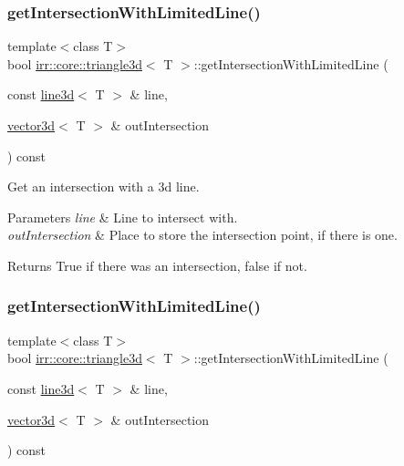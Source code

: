 \subsubsection{\texorpdfstring{get\+Intersection\+With\+Limited\+Line()}{getIntersectionWithLimitedLine()}\hspace{0.1cm}{\footnotesize\ttfamily [1/2]}}
{\footnotesize\ttfamily template$<$class T$>$ \\
bool \hyperlink{classirr_1_1core_1_1triangle3d}{irr\+::core\+::triangle3d}$<$ T $>$\+::get\+Intersection\+With\+Limited\+Line (\begin{DoxyParamCaption}\item[{const \hyperlink{classirr_1_1core_1_1line3d}{line3d}$<$ T $>$ \&}]{line,  }\item[{\hyperlink{classirr_1_1core_1_1vector3d}{vector3d}$<$ T $>$ \&}]{out\+Intersection }\end{DoxyParamCaption}) const\hspace{0.3cm}{\ttfamily [inline]}}



Get an intersection with a 3d line. 


\begin{DoxyParams}{Parameters}
{\em line} & Line to intersect with. \\
\hline
{\em out\+Intersection} & Place to store the intersection point, if there is one. \\
\hline
\end{DoxyParams}
\begin{DoxyReturn}{Returns}
True if there was an intersection, false if not. 
\end{DoxyReturn}
\mbox{\label{classirr_1_1core_1_1triangle3d_a3274d1e1ee1d28050176736c5e6773c2}} 
\subsubsection{\texorpdfstring{get\+Intersection\+With\+Limited\+Line()}{getIntersectionWithLimitedLine()}\hspace{0.1cm}{\footnotesize\ttfamily [2/2]}}
{\footnotesize\ttfamily template$<$class T$>$ \\
bool \hyperlink{classirr_1_1core_1_1triangle3d}{irr\+::core\+::triangle3d}$<$ T $>$\+::get\+Intersection\+With\+Limited\+Line (\begin{DoxyParamCaption}\item[{const \hyperlink{classirr_1_1core_1_1line3d}{line3d}$<$ T $>$ \&}]{line,  }\item[{\hyperlink{classirr_1_1core_1_1vector3d}{vector3d}$<$ T $>$ \&}]{out\+Intersection }\end{DoxyParamCaption}) const\hspace{0.3cm}{\ttfamily [inline]}}



